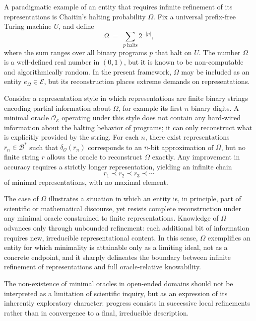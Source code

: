 \begin{example}
A paradigmatic example of an entity that requires infinite refinement of its representations is
Chaitin’s halting probability \(\Omega\).
Fix a universal prefix-free Turing machine \(U\), and define
\[
\Omega \;=\; \sum_{p \text{ halts}} 2^{-|p|},
\]
where the sum ranges over all binary programs \(p\) that halt on \(U\).
The number \(\Omega\) is a well-defined real number in \((0,1)\), but it is known to be non-computable and algorithmically random.
In the present framework, \(\Omega\) may be included as an entity \(e_\Omega \in \mathcal{E}\), but its reconstruction places extreme demands on representations.

Consider a representation style in which representations are finite binary strings encoding partial information about \(\Omega\), for example its first \(n\) binary digits.
A minimal oracle \(\mathcal{O}_{\mathcal{E}}\) operating under this style does not contain any hard-wired information about the halting behavior of programs; it can only reconstruct what is explicitly provided by the string.
For each \(n\), there exist representations \(r_n \in \mathcal{B}^\ast\) such that \(\delta_{\mathcal{O}}(r_n)\) corresponds to an \(n\)-bit approximation of \(\Omega\), but no finite string \(r\) allows the oracle to reconstruct \(\Omega\) exactly.
Any improvement in accuracy requires a strictly longer representation, yielding an infinite chain
\[
r_1 \prec r_2 \prec r_3 \prec \cdots
\]
of minimal representations, with no maximal element.

The case of \(\Omega\) illustrates a situation in which an entity is, in principle, part of scientific or mathematical discourse, yet resists complete reconstruction under any minimal oracle constrained to finite representations.
Knowledge of \(\Omega\) advances only through unbounded refinement: each additional bit of information requires new, irreducible representational content.
In this sense, \(\Omega\) exemplifies an entity for which minimality is attainable only as a limiting ideal, not as a concrete endpoint, and it sharply delineates the boundary between infinite refinement of representations and full oracle-relative knowability.
\end{example}

The non-existence of minimal oracles in open-ended domains should not be interpreted as a limitation of scientific inquiry, but as an expression of its inherently exploratory character: progress consists in successive local refinements rather than in convergence to a final, irreducible description.

